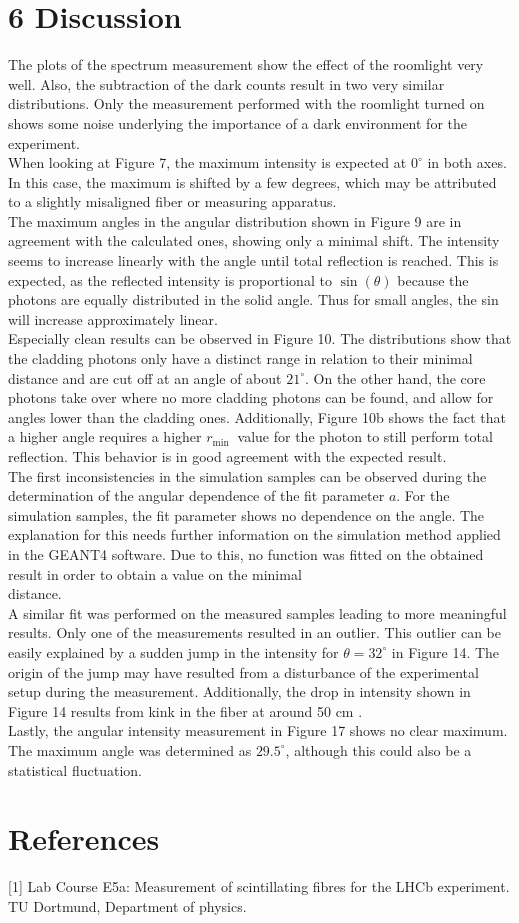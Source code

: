 \documentclass[10pt]{article}
\begin{document}
\section*{6 Discussion}
The plots of the spectrum measurement show the effect of the roomlight very well. Also, the subtraction of the dark counts result in two very similar distributions. Only the measurement performed with the roomlight turned on shows some noise underlying the importance of a dark environment for the experiment.\\
When looking at Figure 7, the maximum intensity is expected at $0^{\circ}$ in both axes. In this case, the maximum is shifted by a few degrees, which may be attributed to a slightly misaligned fiber or measuring apparatus.\\
The maximum angles in the angular distribution shown in Figure 9 are in agreement with the calculated ones, showing only a minimal shift. The intensity seems to increase linearly with the angle until total reflection is reached. This is expected, as the reflected intensity is proportional to $\sin (\theta)$ because the photons are equally distributed in the solid angle. Thus for small angles, the sin will increase approximately linear.\\
Especially clean results can be observed in Figure 10. The distributions show that the cladding photons only have a distinct range in relation to their minimal distance and are cut off at an angle of about $21^{\circ}$. On the other hand, the core photons take over where no more cladding photons can be found, and allow for angles lower than the cladding ones. Additionally, Figure 10b shows the fact that a higher angle requires a higher $r_{\text {min }}$ value for the photon to still perform total reflection. This behavior is in good agreement with the expected result.\\
The first inconsistencies in the simulation samples can be observed during the determination of the angular dependence of the fit parameter $a$. For the simulation samples, the fit parameter shows no dependence on the angle. The explanation for this needs further information on the simulation method applied in the GEANT4 software. Due to this, no function was fitted on the obtained result in order to obtain a value on the minimal\\
distance.\\
A similar fit was performed on the measured samples leading to more meaningful results. Only one of the measurements resulted in an outlier. This outlier can be easily explained by a sudden jump in the intensity for $\theta=32^{\circ}$ in Figure 14. The origin of the jump may have resulted from a disturbance of the experimental setup during the measurement. Additionally, the drop in intensity shown in Figure 14 results from kink in the fiber at around 50 cm .\\
Lastly, the angular intensity measurement in Figure 17 shows no clear maximum. The maximum angle was determined as $29.5^{\circ}$, although this could also be a statistical fluctuation.

\section*{References}
[1] Lab Course E5a: Measurement of scintillating fibres for the LHCb experiment. TU Dortmund, Department of physics.
\end{document}
